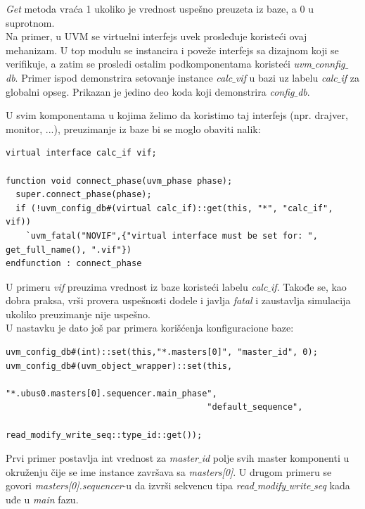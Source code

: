 \emph{Get} metoda vraća 1 ukoliko je vrednost uspešno preuzeta iz baze, a 0 u
suprotnom.\\

Na primer, u UVM se virtuelni interfejs uvek prosleđuje koristeći ovaj
mehanizam. U top modulu se instancira i poveže interfejs sa dizajnom koji se
verifikuje, a zatim se prosledi ostalim podkomponentama koristeći
\emph{uvm\(\_\)connfig\(\_\)db}. Primer ispod demonstrira setovanje instance
\emph{calc\(\_\)vif} u bazi uz labelu \emph{calc\(\_\)if} za globalni opseg.
Prikazan je jedino deo koda koji demonstrira \emph{config\(\_\)db}.



U svim komponentama u kojima želimo da koristimo taj interfejs (npr. drajver,
monitor, ...), preuzimanje iz baze bi se moglo obaviti nalik:

\begin{lstlisting}
virtual interface calc_if vif;

function void connect_phase(uvm_phase phase);
  super.connect_phase(phase);
  if (!uvm_config_db#(virtual calc_if)::get(this, "*", "calc_if", vif))
    `uvm_fatal("NOVIF",{"virtual interface must be set for: ", get_full_name(), ".vif"})
endfunction : connect_phase
\end{lstlisting}

U primeru \emph{vif} preuzima vrednost iz baze koristeći labelu \emph{calc\(\_\)if}.
Takođe se, kao dobra praksa, vrši provera uspešnosti dodele i javlja
\emph{fatal} i zaustavlja simulacija ukoliko preuzimanje nije uspešno.\\

U nastavku je dato još par primera korišćenja konfiguracione baze:

\begin{lstlisting}
uvm_config_db#(int)::set(this,"*.masters[0]", "master_id", 0);
uvm_config_db#(uvm_object_wrapper)::set(this,
                                        "*.ubus0.masters[0].sequencer.main_phase",
                                        "default_sequence",
                                        read_modify_write_seq::type_id::get());
\end{lstlisting}

Prvi primer postavlja int vrednost za \emph{master\(\_\)id} polje svih master
komponenti u okruženju čije se ime instance završava sa \emph{masters[0]}. U
drugom primeru se govori \emph{masters[0].sequencer}-u da izvrši sekvencu tipa
\emph{read\(\_\)modify\(\_\)write\(\_\)seq} kada uđe u \emph{main} fazu.\\

